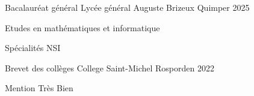 

\begin{cventries}

  \cventry
    {Bacalauréat général} %
    {Lycée général Auguste Brizeux} %
    {Quimper} %
    {2025} %
    {
      \begin{cvitems} %
        \item {Etudes en mathématiques et informatique}
        \item {Spécialités NSI}
      \end{cvitems}
    }

\cventry
    {Brevet des collèges} %
    {College Saint-Michel} %
    {Rosporden} %
    {2022} %
    {
      \begin{cvitems} %
        \item {Mention Très Bien}
      \end{cvitems}
    }
\end{cventries}
